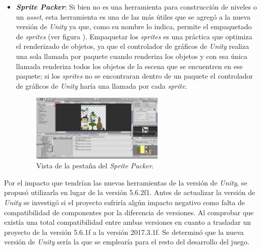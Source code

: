 \begin{itemize}
		\item \textbf{\textit{Sprite Packer}}: Si bien no es una herramienta para 
		construcción de niveles o un \textit{asset}, esta herramienta es una de las 
		más útiles que se agregó a la nueva versión de \textit{Unity} ya que, como 
		su nombre lo indica, permite el empaquetado de \textit{sprites} (ver figura ). 
		Empaquetar 
		los \textit{sprites} es una práctica que optimiza el renderizado de objetos, 
		ya que el controlador de gráficos de \textit{Unity} realiza una sola llamada 
		por paquete cuando renderiza los objetos y con esa única llamada renderiza todos 
		los objetos de la escena que se encuentren en ese paquete; si los 
		\textit{sprites} no se encontraran dentro de un paquete el controlador de 
		gráficos de \textit{Unity} haría una llamada por cada \textit{sprite}.  
			\begin{figure}[h]
    			\centering
    			\includegraphics[width=0.6\textwidth]{02Antecedentes/Imagenes/01.png}
    			\caption{Vista de la pestaña del \textit{Sprite Packer}.}
    			\label{fig:CinemaPantalla}
			\end{figure}
	\end{itemize}
	Por el impacto que tendrían las nuevas herramientas de la versión de 
	\textit{Unity}, se propusó utilizarla en lugar de la versión 5.6.2f1. Antes 
	de actualizar la versión de \textit{Unity} se investigó si el proyecto sufriría 
	algún impacto negativo como falta de compatibilidad de componentes por la 
	diferencia de versiones. Al comprobar que existía una total compatibilidad 
	entre ambas versiones en cuanto a trasladar un proyecto de la versión 5.6.1f 
	a la versión 2017.3.1f. Se determinó que la nueva versión de \textit{Unity} 
	sería la que se emplearía para el resto del desarrollo del juego.